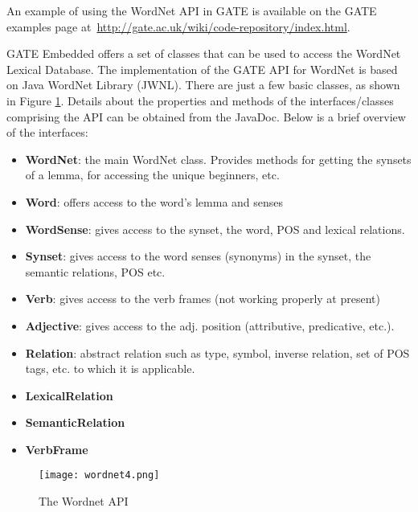 An example of using the WordNet API in GATE is available on the GATE examples
page at~\url{http://gate.ac.uk/wiki/code-repository/index.html}.


GATE Embedded offers a set of classes that can be used to access the
WordNet Lexical Database. The implementation of the GATE API
for WordNet is based on Java WordNet Library (JWNL). There are just a
few basic classes, as shown in Figure
\ref{fig:wordnet4}. Details about the properties and methods of the
interfaces/classes comprising the API can be obtained from the
JavaDoc. Below is a brief overview of the interfaces:
\begin{itemize}
\item \textbf{WordNet}: the main WordNet class. Provides methods for getting the
synsets of a lemma, for accessing the unique beginners, etc.

\item \textbf{Word}: offers access to the word's lemma and senses

\item \textbf{WordSense}: gives access to the synset, the word, POS
and lexical relations.

\item \textbf{Synset}: gives access to the word senses (synonyms) in
the synset, the semantic relations, POS etc.

\item \textbf{Verb}: gives access to the verb frames (not working
properly at present)

\item \textbf{Adjective}: gives access to the adj. position
(attributive, predicative, etc.).

\item \textbf{Relation}: abstract relation such as type, symbol,
inverse relation, set of POS tags, etc. to which it is applicable.

\item \textbf{LexicalRelation}

\item \textbf{SemanticRelation}

\item \textbf{VerbFrame}
\end{itemize}

\begin{figure}[!htb]
\begin{center}
\texttt{[image: wordnet4.png]}
\caption{The Wordnet API}
\label{fig:wordnet4}
\end{center}
\end{figure}
 

